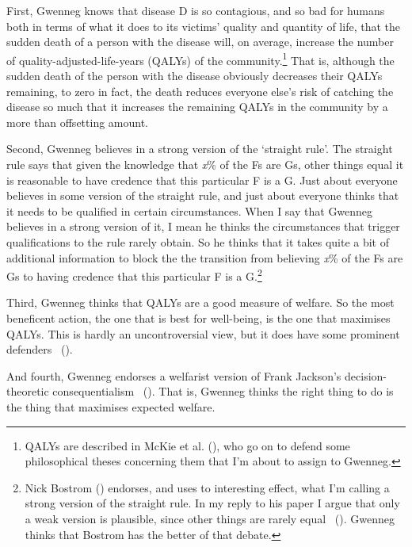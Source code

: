 \documentclass[
  10pt,
  letterpaper,
  twoside]{scrbook}
\begin{document}
First, {Gwenneg} knows that disease D is so contagious, and so bad for
humans both in terms of what it does to its victims' quality and
quantity of life, that the sudden death of a person with the disease
will, on average, increase the number of quality-adjusted-life-years
(QALYs) of the community.\footnote{QALYs are described in McKie et al.
  (), who go on to defend some
  philosophical theses concerning them that I'm about to assign to
  {Gwenneg}.} That is, although the sudden death of the person with the
disease obviously decreases their QALYs remaining, to zero in fact, the
death reduces everyone else's risk of catching the disease so much that
it increases the remaining QALYs in the community by a more than
offsetting amount.

Second, {Gwenneg} believes in a strong version of the `straight rule'.
The straight rule says that given the knowledge that \emph{x}\% of the
Fs are Gs, other things equal it is reasonable to have credence that
this particular F is a G. Just about everyone believes in some version
of the straight rule, and just about everyone thinks that it needs to be
qualified in certain circumstances. When I say that {Gwenneg} believes
in a strong version of it, I mean he thinks the circumstances that
trigger qualifications to the rule rarely obtain. So he thinks that it
takes quite a bit of additional information to block the the transition
from believing \emph{x}\% of the Fs are Gs to having credence that this
particular F is a G.\footnote{Nick Bostrom
  () endorses, and uses to interesting
  effect, what I'm calling a strong version of the straight rule. In my
  reply to his paper I argue that only a weak version is plausible,
  since other things are rarely equal
  ~(). {Gwenneg}
  thinks that Bostrom has the better of that debate.}

Third, {Gwenneg} thinks that QALYs are a good measure of welfare. So the
most beneficent action, the one that is best for well-being, is the one
that maximises QALYs. This is hardly an uncontroversial view, but it
does have some prominent defenders ~().

And fourth, {Gwenneg} endorses a welfarist version of {Frank} Jackson's
decision-theoretic consequentialism ~(). That is, {Gwenneg} thinks the right thing to do is the thing
that maximises expected welfare.
\end{document}
